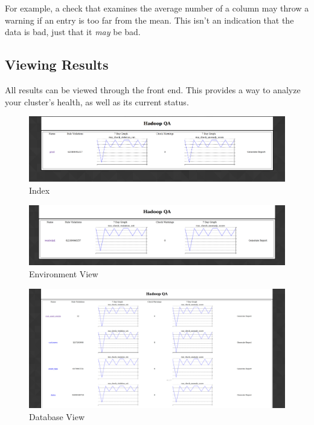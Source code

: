         For example, a check that examines the average number of a column may throw a warning if an entry is too far from the
        mean. This isn't an indication that the data is bad, just that it \textit{may} be bad.

    \subsection{Viewing Results}
    All results can be viewed through the front end. This provides a way to analyze your cluster's health, as well as its
    current status.

    \begin{figure}[H]
        \centering
        \includegraphics[scale=0.2]{./img/index.png}
        \caption{Index}
    \end{figure}

    \begin{figure}[H]
        \centering
        \includegraphics[scale=0.2]{./img/prod.png}
        \caption{Environment View}
    \end{figure}

    \begin{figure}[H]
        \centering
        \includegraphics[scale=0.2]{./img/westwind.png}
        \caption{Database View}
    \end{figure}

